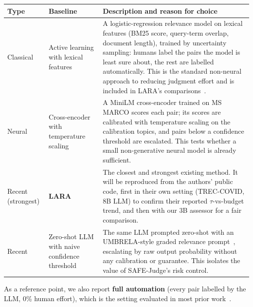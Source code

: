 \documentclass[11pt,a4paper]{article}
\begin{document}
\begin{table}[H]
\centering\small
\begin{tabularx}{\textwidth}{@{}P{2.2cm} P{3.4cm} Y@{}}
\toprule
\textbf{Type} & \textbf{Baseline} & \textbf{Description and reason for choice} \\
\midrule
Classical & Active learning with lexical features & A logistic-regression relevance model on lexical features (BM25 score, query-term overlap, document length), trained by uncertainty sampling: humans label the pairs the model is least sure about, the rest are labelled automatically. This is the standard non-neural approach to reducing judgment effort and is included in LARA's comparisons~\cite{lara2025}. \\
Neural & Cross-encoder with temperature scaling & A MiniLM cross-encoder trained on MS MARCO scores each pair; its scores are calibrated with temperature scaling on the calibration topics, and pairs below a confidence threshold are escalated. This tests whether a small non-generative neural model is already sufficient. \\
Recent (strongest) & \textbf{LARA}~\cite{lara2025} & The closest and strongest existing method. It will be reproduced from the authors' public code, first in their own setting (TREC-COVID, 8B LLM) to confirm their reported $\tau$-vs-budget trend, and then with our 3B assessor for a fair comparison. \\
Recent & Zero-shot LLM with naive confidence threshold & The same LLM prompted zero-shot with an UMBRELA-style graded relevance prompt~\cite{umbrela}, escalating by raw output probability without any calibration or guarantee. This isolates the value of SAFE-Judge's risk control. \\
\bottomrule
\end{tabularx}
\end{table}

As a reference point, we also report \textbf{full automation} (every pair labelled by the LLM, 0\% human effort), which is the setting evaluated in most prior work~\cite{faggioli2023,thomas2024,arabzadeh2025}.
\end{document}
